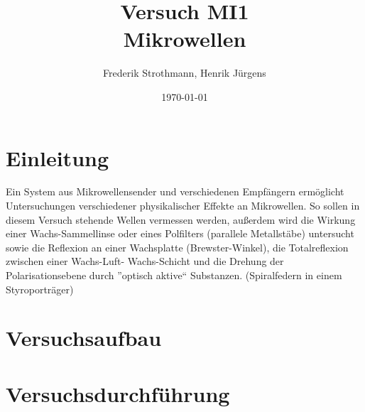 \documentclass[12pt]{scrartcl}
\title{Versuch MI1\\ Mikrowellen}
\author{Frederik Strothmann, Henrik Jürgens}
\date{\today}
\begin{document}

\maketitle
\tableofcontents
\newpage


\section{Einleitung}

Ein System aus Mikrowellensender und verschiedenen Empfängern ermöglicht Untersuchungen verschiedener physikalischer Effekte an Mikrowellen. So sollen in diesem Versuch stehende Wellen vermessen werden, außerdem wird die Wirkung einer Wachs-Sammellinse oder eines Polfilters (parallele Metallstäbe) untersucht sowie die Reflexion
an einer Wachsplatte (Brewster-Winkel), die Totalreflexion zwischen einer Wachs-Luft-
Wachs-Schicht und die Drehung der Polarisationsebene durch
”optisch aktive“ Substanzen.
(Spiralfedern in einem Styroporträger)

\section{Versuchsaufbau}

\section{Versuchsdurchführung}
\end{document}
